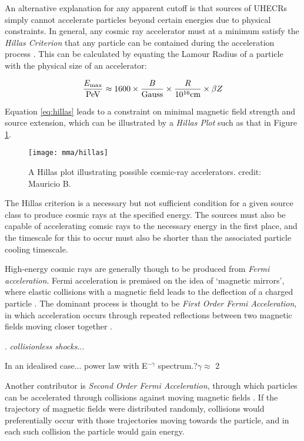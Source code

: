 An alternative explanation for any apparent cutoff is that sources of UHECRs simply cannot accelerate particles beyond certain energies due to physical constraints. In general, any cosmic ray accelerator must at a minimum satisfy the \emph{Hillas Criterion} that any particle can be contained during the acceleration process . This can be calculated by equating the Lamour Radius of a particle with the physical size of an accelerator:

\begin{equation}
	\frac{E_{\textup{max}}}{\textup{PeV}} \approx
	1600 \times \frac{B}{\textup{Gauss}} \times \frac{R}{10^{16} \textup{cm}} \times
	\beta Z
	\label{eq:hillas}
\end{equation}

Equation \ref{eq:hillas} leads to a constraint on minimal magnetic field strength and source extension, which can be illustrated by a \emph{Hillas Plot} such as that in Figure \ref{fig:hillas_plot}. 

\begin{figure}[!ht]
	\centering \texttt{[image: mma/hillas]}
	\caption{A Hillas plot illustrating possible cosmic-ray accelerators. credit: Mauricio B.}
	\label{fig:hillas_plot}
\end{figure}

The Hillas criterion is a necessary but not sufficient condition for a given source class to produce cosmic rays at the specified energy. The sources must also be capable of accelerating comsic rays to the necessary energy in the first place, and the timescale for this to occur must also be shorter than the associated particle cooling timescale. 

High-energy cosmic rays are generally though to be produced from \emph{Fermi acceleration}. Fermi acceleration is premised on the idea of `magnetic mirrors', where elastic collisions with a magnetic field leads to the deflection of a charged particle . The dominant process is thought to be \emph{First Order Fermi Acceleration}, in which acceleration occurs through repeated reflections between two magnetic fields moving closer together .

. \emph{collisionless shocks}...

In an idealised case... power law with E$^{-\gamma}$ spectrum.?$ \gamma \approx$ 2

Another contributor is \emph{Second Order Fermi Acceleration}, through which particles can be accelerated through collisions against moving magnetic fields . If the trajectory of magnetic fields were distributed randomly, collisions would preferentially occur with those trajectories moving towards the particle, and in each such collision the particle would gain energy. 

